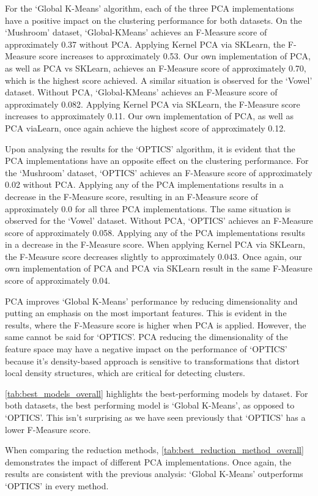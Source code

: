 For the `Global K-Means' algorithm, each of the three 
PCA implementations have a positive impact on the clustering performance for both datasets.
On the `Mushroom' dataset, `Global-KMeans' achieves an F-Measure score of approximately 0.37
without PCA. Applying Kernel PCA via SKLearn, the F-Measure score increases to approximately 0.53. 
Our own implementation of PCA, as well as PCA vs SKLearn, achieves an F-Measure score of approximately 0.70,
which is the highest score achieved.  
A similar situation is observed for the `Vowel' dataset. Without PCA, `Global-KMeans'
achieves an F-Measure score of approximately 0.082. Applying Kernel PCA via SKLearn,
the F-Measure score increases to approximately 0.11. Our own implementation of PCA,
as well as PCA viaLearn, once again achieve the highest score of approximately 0.12.

Upon analysing the results for the `OPTICS' algorithm, it is evident that the PCA implementations
have an opposite effect on the clustering performance. For the `Mushroom' dataset, `OPTICS' achieves
an F-Measure score of approximately 0.02 without PCA. Applying any of the PCA implementations
results in a decrease in the F-Measure score, resulting in an F-Measure score of approximately 0.0 
for all three PCA implementations.
The same situation is observed for the `Vowel' dataset. Without PCA, `OPTICS' achieves an F-Measure score
of approximately 0.058. Applying any of the PCA implementations results in a decrease in the F-Measure score.
When applying Kernel PCA via SKLearn, the F-Measure score decreases slightly to approximately 0.043.
Once again, our own implementation of PCA and PCA via SKLearn result in the same F-Measure
score of approximately 0.04.

PCA improves `Global K-Means' performance by reducing dimensionality and putting 
an emphasis on the most important features. This is evident in the results, where the
F-Measure score is higher when PCA is applied. However, the same cannot be said for `OPTICS'.
PCA reducing the dimensionality of the feature space may have a negative
impact on the performance of `OPTICS' because it's density-based approach is sensitive
to transformations that distort local density structures, which are critical for detecting
clusters\cite{sepin2023comparisonclusteringalgorithmsstatistical}.

\vspace{1em}

\autoref{tab:best_models_overall} highlights the best-performing models by dataset.
For both datasets, the best performing model is `Global K-Means', as opposed to `OPTICS'.
This isn't surprising as we have seen previously that `OPTICS' has a lower F-Measure score.



When comparing the reduction methods, \autoref{tab:best_reduction_method_overall} demonstrates the impact of
different PCA implementations. Once again, the results are consistent with the previous analysis:
`Global K-Means' outperforms `OPTICS' in every method. 

